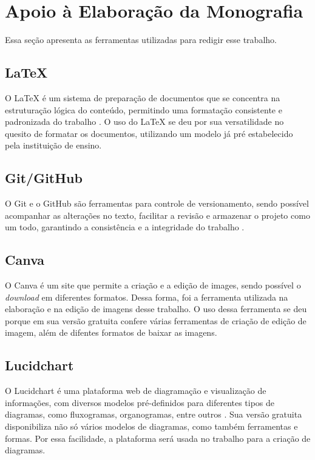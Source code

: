 \section{Apoio à Elaboração da Monografia}\label{sec:elaboracaomono}
Essa seção apresenta as ferramentas utilizadas para redigir esse trabalho.

\subsection{LaTeX}\label{subsec:latex}
O LaTeX é um sistema de preparação de documentos que se concentra na estruturação lógica do conteúdo, permitindo
uma formatação consistente e padronizada do trabalho \cite{latexsite}. O uso do LaTeX se deu por sua versatilidade no quesito
de formatar os documentos, utilizando um modelo já pré estabelecido pela instituição de ensino.

\subsection{Git/GitHub}\label{subsec:git}
O Git e o GitHub são ferramentas para controle de versionamento, sendo possível acompanhar as alterações no texto,
facilitar a revisão e armazenar o projeto como um todo, garantindo a consistência e a integridade do trabalho \cite{githubsite}.

\subsection{Canva}\label{subsec:canva}
O Canva \cite{canva} é um site que permite a criação e a edição de images, sendo possível o \textit{download} em diferentes formatos.
Dessa forma, foi a ferramenta utilizada na elaboração e na edição de imagens desse trabalho. O uso dessa ferramenta se deu porque
em sua versão gratuita confere várias ferramentas de criação de edição de imagem, além de difentes formatos de baixar as imagens.

\subsection{Lucidchart}\label{subsec:lucidchart}
O Lucidchart é uma plataforma web de diagramação e visualização de informações, com diversos modelos pré-definidos para 
diferentes tipos de diagramas, como fluxogramas, organogramas, entre outros \cite{lucidchart}. Sua versão gratuita disponibiliza não só vários
modelos de diagramas, como também ferramentas e formas. Por essa facilidade, a plataforma será usada no trabalho para
a criação de diagramas.

